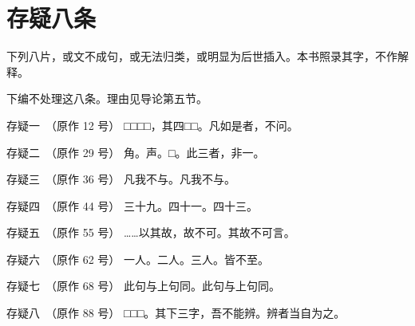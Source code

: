 \chapter*{存疑八条}
{}

下列八片，或文不成句，或无法归类，或明显为后世插入。本书照录其字，不作解释。

下编不处理这八条。理由见导论第五节。

\begin{cunyi}{存疑一　（原作 12 号）}
□□□□，其四□□。凡如是者，不问。
\end{cunyi}

\begin{cunyi}{存疑二　（原作 29 号）}
角。声。□。此三者，非一。
\end{cunyi}

\begin{cunyi}{存疑三　（原作 36 号）}
凡我不与。凡我不与。
\end{cunyi}

\begin{cunyi}{存疑四　（原作 44 号）}
三十九。四十一。四十三。
\end{cunyi}

\begin{cunyi}{存疑五　（原作 55 号）}
……以其故，故不可。其故不可言。
\end{cunyi}

\begin{cunyi}{存疑六　（原作 62 号）}
一人。二人。三人。皆不至。
\end{cunyi}

\begin{cunyi}{存疑七　（原作 68 号）}
此句与上句同。此句与上句同。
\end{cunyi}

\begin{cunyi}{存疑八　（原作 88 号）}
□□□。其下三字，吾不能辨。辨者当自为之。
\end{cunyi}
